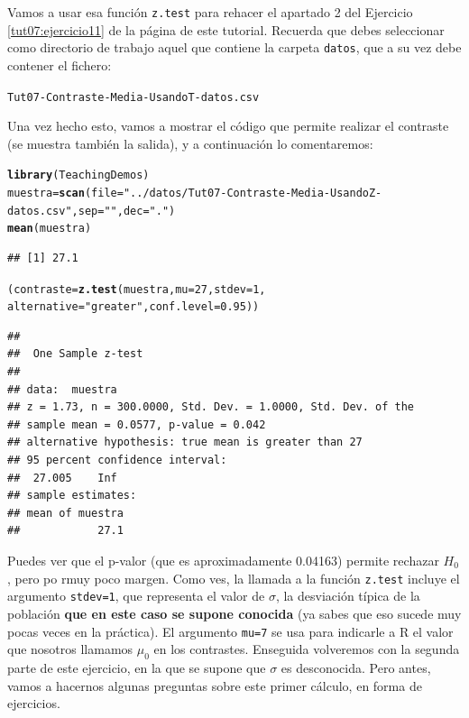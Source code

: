 \documentclass[10pt,a4paper]{article}\usepackage[]{graphicx}\usepackage[]{color}
\makeatletter
\newcommand{\hlnum}[1]{\textcolor[rgb]{0.686,0.059,0.569}{#1}}%
\newcommand{\hlstr}[1]{\textcolor[rgb]{0.192,0.494,0.8}{#1}}%
\newcommand{\hlstd}[1]{\textcolor[rgb]{0.345,0.345,0.345}{#1}}%
\newcommand{\hlkwb}[1]{\textcolor[rgb]{0.69,0.353,0.396}{#1}}%
\newcommand{\hlkwc}[1]{\textcolor[rgb]{0.333,0.667,0.333}{#1}}%
\newcommand{\hlkwd}[1]{\textcolor[rgb]{0.737,0.353,0.396}{\textbf{#1}}}%
\newenvironment{kframe}{%
 \def\at@end@of@kframe{}%
 \ifinner\ifhmode%
  \def\at@end@of@kframe{\end{minipage}}%
  \begin{minipage}{\columnwidth}%
 \fi\fi%
 \def\FrameCommand##1{\hskip\@totalleftmargin \hskip-\fboxsep
 \colorbox{shadecolor}{##1}\hskip-\fboxsep
     \hskip-\linewidth \hskip-\@totalleftmargin \hskip\columnwidth}%
 \MakeFramed {\advance\hsize-\width
   \@totalleftmargin\z@ \linewidth\hsize
   \@setminipage}}%
 {\par\unskip\endMakeFramed%
 \at@end@of@kframe}
\newenvironment{knitrout}{}{} %
\newcounter {cont01}
\makeatother
\begin{document}
Vamos a usar esa función {\tt z.test} para rehacer el apartado 2 del Ejercicio \ref{tut07:ejercicio11} de la página \pageref{tut07:ejercicio11} de este tutorial. Recuerda que debes seleccionar como directorio de trabajo aquel que contiene la carpeta {\tt datos}, que a su vez debe contener el fichero:
\begin{center}
{\tt Tut07-Contraste-Media-UsandoT-datos.csv}
\end{center}
Una vez hecho esto, vamos a mostrar el código que permite realizar el contraste (se muestra también la salida), y a continuación lo comentaremos:
\begin{knitrout}
\color{fgcolor}\begin{kframe}
\begin{alltt}
\hlkwd{library}\hlstd{(TeachingDemos)}
\hlstd{muestra} \hlkwb{=} \hlkwd{scan}\hlstd{(}\hlkwc{file}\hlstd{=}\hlstr{"../datos/Tut07-Contraste-Media-UsandoZ-datos.csv"}\hlstd{,}\hlkwc{sep}\hlstd{=}\hlstr{" "}\hlstd{,}\hlkwc{dec}\hlstd{=}\hlstr{"."}\hlstd{)}
\hlkwd{mean}\hlstd{(muestra)}
\end{alltt}
\begin{verbatim}
## [1] 27.1
\end{verbatim}
\begin{alltt}
\hlstd{(contraste} \hlkwb{=} \hlkwd{z.test}\hlstd{(muestra,} \hlkwc{mu} \hlstd{=} \hlnum{27}\hlstd{,} \hlkwc{stdev} \hlstd{=} \hlnum{1}\hlstd{,}
  \hlkwc{alternative}\hlstd{=}\hlstr{"greater"}\hlstd{,} \hlkwc{conf.level} \hlstd{=} \hlnum{0.95}\hlstd{))}
\end{alltt}
\begin{verbatim}
## 
## 	One Sample z-test
## 
## data:  muestra
## z = 1.73, n = 300.0000, Std. Dev. = 1.0000, Std. Dev. of the
## sample mean = 0.0577, p-value = 0.042
## alternative hypothesis: true mean is greater than 27
## 95 percent confidence interval:
##  27.005    Inf
## sample estimates:
## mean of muestra 
##            27.1
\end{verbatim}
\end{kframe}
\end{knitrout}

Puedes ver que el p-valor (que es aproximadamente 0.04163) permite rechazar $H_0$, pero po rmuy poco margen. Como ves, la llamada a la función {\tt z.test} incluye el argumento {\tt stdev=1}, que representa el valor de $\sigma$, la desviación típica de la población {\bf que en este caso se supone conocida} (ya sabes que eso sucede muy pocas veces en la práctica). El argumento {\tt mu=7} se usa para indicarle a R el valor que nosotros llamamos $\mu_0$ en los contrastes. Enseguida volveremos con la segunda parte de este ejercicio, en la que se supone que $\sigma$ es desconocida. Pero antes, vamos a hacernos algunas preguntas sobre este primer cálculo, en forma de ejercicios.
\end{document}
